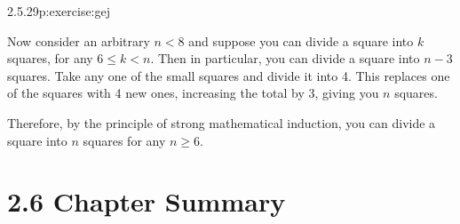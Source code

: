 \documentclass[twoside,11pt,]{book}
\numberwithin{equation}{chapter}
\newcommand{\lt}{<}
\begin{document}
\begin{divisionsolution}{2.5.29}{}{p:exercise:gej}
\begin{solutionproof}
\begin{sidebyside}{3}{0.0166666666666667}{0.0166666666666667}{0.0333333333333333}
\begin{sbspanel}{0.3}
{\begin{tikzpicture}[scale=.75]
\end{tikzpicture}
}%
\end{sbspanel}%
\begin{sbspanel}{0.3}%
%
\end{sbspanel}%
\end{sidebyside}%
\par
Now consider an arbitrary \(n \lt 8\) and suppose you can divide a square into \(k\) squares, for any \(6 \le k \lt n\). Then in particular, you can divide a square into \(n-3\) squares. Take any one of the small squares and divide it into 4. This replaces one of the squares with 4 new ones, increasing the total by 3, giving you \(n\) squares.%
\par
Therefore, by the principle of strong mathematical induction, you can divide a square into \(n\) squares for any \(n \ge 6\).%
\end{solutionproof}
\end{divisionsolution}%
\section*{2.6 Chapter Summary}
\end{document}
